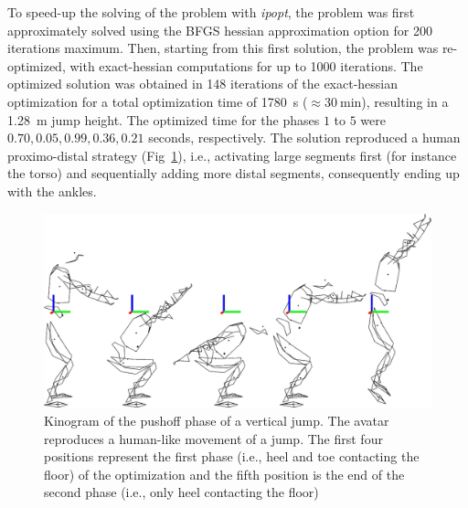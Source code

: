To speed-up the solving of the problem with \emph{ipopt}, the problem was first approximately solved using the BFGS hessian approximation option for 200 iterations maximum.
Then, starting from this first solution, the problem was re-optimized, with exact-hessian computations for up to 1000 iterations.
The optimized solution was obtained in 148 iterations of the exact-hessian optimization for a total optimization time of \SI{1780}{\second} ($\approx\SI{30}{\minute}$), resulting in a \SI{1.28}{\meter} jump height.
The optimized time for the phases $1$ to $5$ were $0.70, 0.05, 0.99, 0.36, 0.21$ seconds, respectively.
The solution reproduced a human proximo-distal strategy (Fig~\ref{fig:graph_force_vitesse_longueur}), i.e., activating large segments first (for instance the torso) and sequentially adding more distal segments, consequently ending up with the ankles.

\begin{figure}[h!]
\includegraphics[width=\columnwidth]{figures/kinogramme_jump}
\caption{Kinogram of the pushoff phase of a vertical jump. The avatar reproduces a human-like movement of a jump. The first four positions represent the first phase (i.e., heel and toe contacting the floor) of the optimization and the fifth position is the end of the second phase (i.e., only heel contacting the floor)} 
\label{fig:graph_force_vitesse_longueur}
\end{figure}

